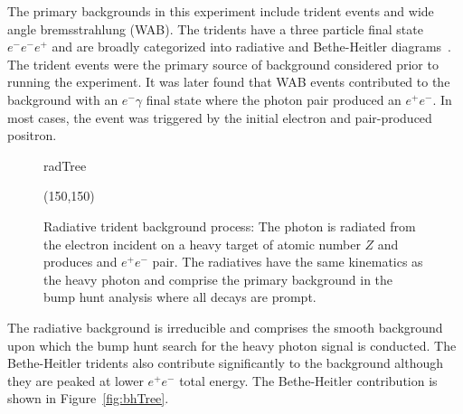 The primary backgrounds in this experiment include trident events and wide angle bremsstrahlung (WAB). The tridents have a three particle final state $e^-e^-e^+$ and are broadly categorized into radiative and Bethe-Heitler diagrams~\cite{bjorken_new_2009}. The trident events were the primary source of background considered prior to running the experiment. It was later found that WAB events contributed to the background with an $e^-\gamma$ final state where the photon pair produced an $e^+e^-$. In most cases, the event was triggered by the initial electron and pair-produced positron. 

\begin{figure}[htb]
    \begin{center}
	\begin{fmffile}{radTree}
	\begin{fmfgraph*}(150,150)
	\fmfstraight
		\fmffreeze
		\fmffreeze	
	\end{fmfgraph*}
	\end{fmffile}
  	\end{center}
    	\caption[Radiative background]{Radiative trident background process: The photon is radiated from the electron incident on a heavy target of atomic number $Z$ and produces and $e^+e^-$ pair. The radiatives have the same kinematics as the heavy photon and comprise the primary background in the bump hunt analysis where all decays are prompt. }
   	 \label{fig:radTree}	
\end{figure}

The radiative background is irreducible and comprises the smooth background upon which the bump hunt search for the heavy photon signal is conducted. The Bethe-Heitler tridents also contribute significantly to the background although they are peaked at lower $e^+e^-$ total energy. The Bethe-Heitler contribution is shown in Figure~\ref{fig:bhTree}.

